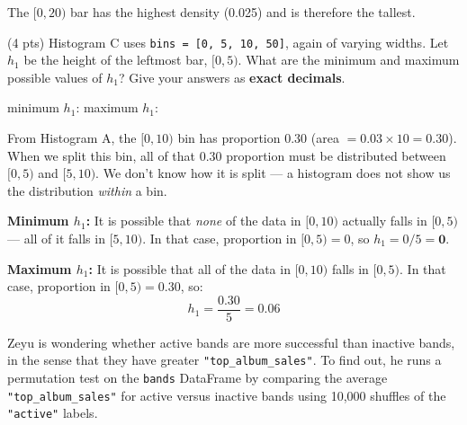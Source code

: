 \documentclass[twoside,12pt]{article}
\begin{document}
\begin{probset}
\begin{prob}[(8 pts)]
\begin{subprobset}
\begin{subprob}
\begin{soln}
\smallskip
The $[0, 20)$ bar has the highest density (0.025) and is therefore the tallest.
\end{soln}

\end{subprob}

\bigskip

\begin{subprob}(4 pts)
Histogram C uses \texttt{bins = [0, 5, 10, 50]}, again of varying widths. Let $h_1$ be the height of the leftmost bar, $[0, 5)$. What are the minimum and maximum possible values of $h_1$? Give your answers as \textbf{exact decimals}.

\smallskip
\begin{center}
    minimum $h_1$: 
\qquad
maximum $h_1$: 
\end{center}


\begin{soln}

From Histogram A, the $[0, 10)$ bin has proportion 0.30 (area $= 0.03 \times 10 = 0.30$). When we split this bin, all of that 0.30 proportion must be distributed between $[0, 5)$ and $[5, 10)$. We don't know how it is split --- a histogram does not show us the distribution \textit{within} a bin.

\smallskip
\textbf{Minimum $h_1$:} It is possible that \textit{none} of the data in $[0, 10)$ actually falls in $[0, 5)$ --- all of it falls in $[5, 10)$. In that case, proportion in $[0, 5) = 0$, so $h_1 = 0/5 = \mathbf{0}$.

\smallskip
\textbf{Maximum $h_1$:} It is possible that all of the data in $[0, 10)$ falls in $[0, 5)$. In that case, proportion in $[0, 5) = 0.30$, so:
$$h_1 = \frac{0.30}{5} = 0.06$$
\end{soln}

\end{subprob}

\end{subprobset}

\end{prob}

\newpage

\begin{prob}[(18 pts)]

Zeyu is wondering whether active bands are more successful than inactive bands, in the sense that they have greater \texttt{"top\_album\_sales"}. To find out, he runs a permutation test on the \texttt{bands} DataFrame by comparing the average \texttt{"top\_album\_sales"} for active versus inactive bands using 10,000 shuffles of the \texttt{"active"} labels.


\end{prob}
\end{probset}
\end{document}
